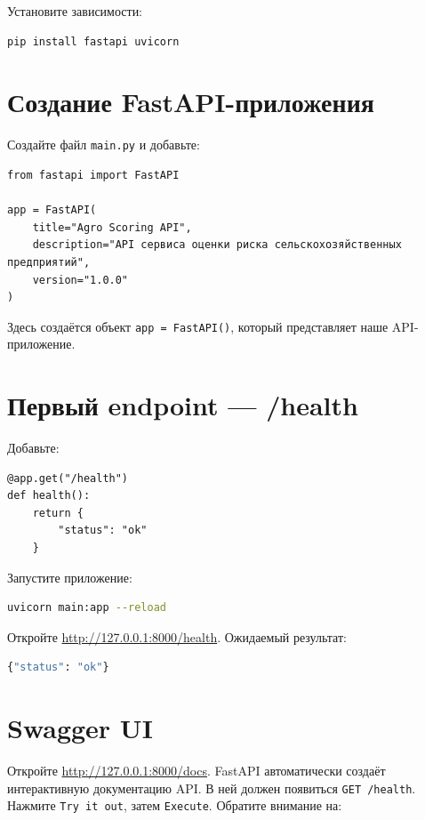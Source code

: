 \documentclass[12pt,a4paper]{article}
\begin{document}
Установите зависимости:

\begin{lstlisting}[language=bash]
pip install fastapi uvicorn
\end{lstlisting}

\section{Создание FastAPI-приложения}

Создайте файл \texttt{main.py} и добавьте:

\begin{lstlisting}[caption={Инициализация FastAPI-приложения}, label={lst:fastapi}]
from fastapi import FastAPI

app = FastAPI(
    title="Agro Scoring API",
    description="API сервиса оценки риска сельскохозяйственных предприятий",
    version="1.0.0"
)
\end{lstlisting}

Здесь создаётся объект \texttt{app = FastAPI()}, который представляет наше API-приложение.

\section{Первый endpoint — /health}

Добавьте:

\begin{lstlisting}[caption={Endpoint /health}]
@app.get("/health")
def health():
    return {
        "status": "ok"
    }
\end{lstlisting}

Запустите приложение:

\begin{lstlisting}[language=bash]
uvicorn main:app --reload
\end{lstlisting}

Откройте \url{http://127.0.0.1:8000/health}. Ожидаемый результат:

\begin{lstlisting}[language=Python]
{"status": "ok"}
\end{lstlisting}

\section{Swagger UI}

Откройте \url{http://127.0.0.1:8000/docs}. FastAPI автоматически создаёт интерактивную документацию API. В ней должен появиться \texttt{GET /health}. Нажмите \texttt{Try it out}, затем \texttt{Execute}. Обратите внимание на:
\end{document}
